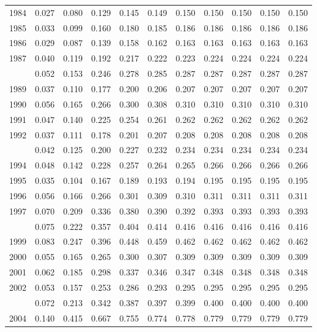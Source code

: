 \documentclass[
]{article}
\begin{document}
\begin{longtable}[t]{lrrrrrrrrrr}
1984 & 0.027 & 0.080 & 0.129 & 0.145 & 0.149 & 0.150 & 0.150 & 0.150 & 0.150 & 0.150\\
1985 & 0.033 & 0.099 & 0.160 & 0.180 & 0.185 & 0.186 & 0.186 & 0.186 & 0.186 & 0.186\\
1986 & 0.029 & 0.087 & 0.139 & 0.158 & 0.162 & 0.163 & 0.163 & 0.163 & 0.163 & 0.163\\
1987 & 0.040 & 0.119 & 0.192 & 0.217 & 0.222 & 0.223 & 0.224 & 0.224 & 0.224 & 0.224\\
\addlinespace
1988 & 0.052 & 0.153 & 0.246 & 0.278 & 0.285 & 0.287 & 0.287 & 0.287 & 0.287 & 0.287\\
1989 & 0.037 & 0.110 & 0.177 & 0.200 & 0.206 & 0.207 & 0.207 & 0.207 & 0.207 & 0.207\\
1990 & 0.056 & 0.165 & 0.266 & 0.300 & 0.308 & 0.310 & 0.310 & 0.310 & 0.310 & 0.310\\
1991 & 0.047 & 0.140 & 0.225 & 0.254 & 0.261 & 0.262 & 0.262 & 0.262 & 0.262 & 0.262\\
1992 & 0.037 & 0.111 & 0.178 & 0.201 & 0.207 & 0.208 & 0.208 & 0.208 & 0.208 & 0.208\\
\addlinespace
1993 & 0.042 & 0.125 & 0.200 & 0.227 & 0.232 & 0.234 & 0.234 & 0.234 & 0.234 & 0.234\\
1994 & 0.048 & 0.142 & 0.228 & 0.257 & 0.264 & 0.265 & 0.266 & 0.266 & 0.266 & 0.266\\
1995 & 0.035 & 0.104 & 0.167 & 0.189 & 0.193 & 0.194 & 0.195 & 0.195 & 0.195 & 0.195\\
1996 & 0.056 & 0.166 & 0.266 & 0.301 & 0.309 & 0.310 & 0.311 & 0.311 & 0.311 & 0.311\\
1997 & 0.070 & 0.209 & 0.336 & 0.380 & 0.390 & 0.392 & 0.393 & 0.393 & 0.393 & 0.393\\
\addlinespace
1998 & 0.075 & 0.222 & 0.357 & 0.404 & 0.414 & 0.416 & 0.416 & 0.416 & 0.416 & 0.416\\
1999 & 0.083 & 0.247 & 0.396 & 0.448 & 0.459 & 0.462 & 0.462 & 0.462 & 0.462 & 0.462\\
2000 & 0.055 & 0.165 & 0.265 & 0.300 & 0.307 & 0.309 & 0.309 & 0.309 & 0.309 & 0.309\\
2001 & 0.062 & 0.185 & 0.298 & 0.337 & 0.346 & 0.347 & 0.348 & 0.348 & 0.348 & 0.348\\
2002 & 0.053 & 0.157 & 0.253 & 0.286 & 0.293 & 0.295 & 0.295 & 0.295 & 0.295 & 0.295\\
\addlinespace
2003 & 0.072 & 0.213 & 0.342 & 0.387 & 0.397 & 0.399 & 0.400 & 0.400 & 0.400 & 0.400\\
2004 & 0.140 & 0.415 & 0.667 & 0.755 & 0.774 & 0.778 & 0.779 & 0.779 & 0.779 & 0.779\\

\end{longtable}
\end{document}
